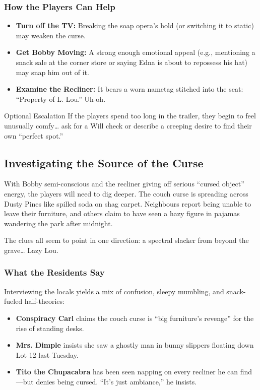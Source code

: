 \subsubsection*{How the Players Can Help}
\begin{itemize}
    \item \textbf{Turn off the TV:} Breaking the soap opera’s hold (or switching it to static) may weaken the curse.
    \item \textbf{Get Bobby Moving:} A strong enough emotional appeal (e.g., mentioning a snack sale at the corner store or saying Edna is about to repossess his hat) may snap him out of it.
    \item \textbf{Examine the Recliner:} It bears a worn nametag stitched into the seat: “Property of L. Lou.” Uh-oh.
\end{itemize}

\begin{CommentBox}{Optional Escalation}
If the players spend too long in the trailer, they begin to feel unusually comfy… ask for a Will check  or describe a creeping desire to find their own “perfect spot.”
\end{CommentBox}

\subsection{Investigating the Source of the Curse}

With Bobby semi-conscious and the recliner giving off serious “cursed object” energy, the players will need to dig deeper. The couch curse is spreading across Dusty Pines like spilled soda on shag carpet. Neighbours report being unable to leave their furniture, and others claim to have seen a hazy figure in pajamas wandering the park after midnight.

The clues all seem to point in one direction: a spectral slacker from beyond the grave… Lazy Lou.

\subsubsection*{What the Residents Say}
Interviewing the locals yields a mix of confusion, sleepy mumbling, and snack-fueled half-theories:
\begin{itemize}
    \item \textbf{Conspiracy Carl} claims the couch curse is “big furniture’s revenge” for the rise of standing desks.
    \item \textbf{Mrs. Dimple} insists she saw a ghostly man in bunny slippers floating down Lot 12 last Tuesday.
    \item \textbf{Tito the Chupacabra} has been seen napping on every recliner he can find—but denies being cursed. “It’s just ambiance,” he insists.
\end{itemize}

